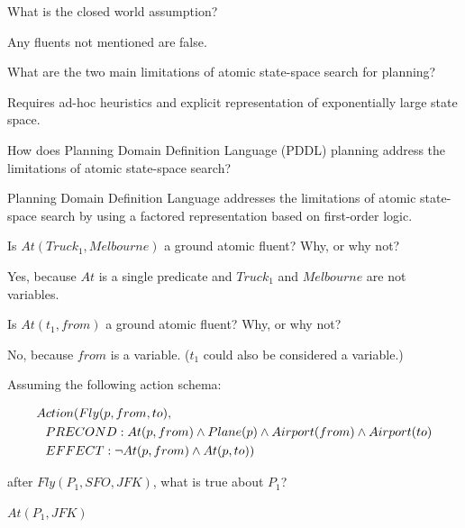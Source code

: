 \begin{questions}

\question What is the closed world assumption?

\begin{solution}[.5in]
Any fluents not mentioned are false.
\end{solution}

\question What are the two main limitations of atomic state-space search for planning?

\begin{solution}[1in]
Requires ad-hoc heuristics and explicit representation of exponentially large state space.
\end{solution}

\question How does Planning Domain Definition Language (PDDL) planning address the limitations of atomic state-space search?

\begin{solution}[1in]
Planning Domain Definition Language addresses the limitations of atomic state-space search by using a factored representation based on first-order logic.
\end{solution}


\question Is $At(Truck_1,Melbourne)$ a ground atomic fluent?  Why, or why not?

\begin{solution}[.5in]
Yes, because $At$ is a single predicate and $Truck_1$ and $Melbourne$ are not variables.
\end{solution}

\question Is $At(t_1, from)$ a ground atomic fluent? Why, or why not?

\begin{solution}[.5in]
No, because $from$ is a variable.  ($t_1$ could also be considered a variable.)
\end{solution}



\question Assuming the following action schema:

\vspace{-.25in}
\begin{align*}
& Action(Fly(p,from,to),\\
& \hspace{.1in} PRECOND:At(p,from) \land Plane(p) \land Airport(from) \land Airport(to)\\
& \hspace{.1in} EFFECT: \neg At(p,from) \land At(p,to))
\end{align*}
\vspace{-.1in}

after $Fly(P_1,SFO,JFK)$, what is true about $P_1$?

\begin{solution}[.5in]
$At(P_1, JFK)$
\end{solution}


\end{questions}


